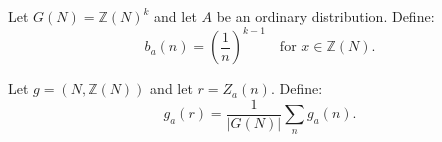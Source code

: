 Let $G(N) = \mathbb{Z}(N)^k$ and let $A$ be an ordinary distribution. Define:
$$b_a(n) = \left(\frac{1}{n}\right)^{k-1} \quad \text{for } x \in \mathbb{Z}(N).$$

Let $g = (N, \mathbb{Z}(N))$ and let $r = Z_a(n)$. Define:
$$g_a(r) = \frac{1}{|G(N)|} \sum_{n} g_a(n).$$
